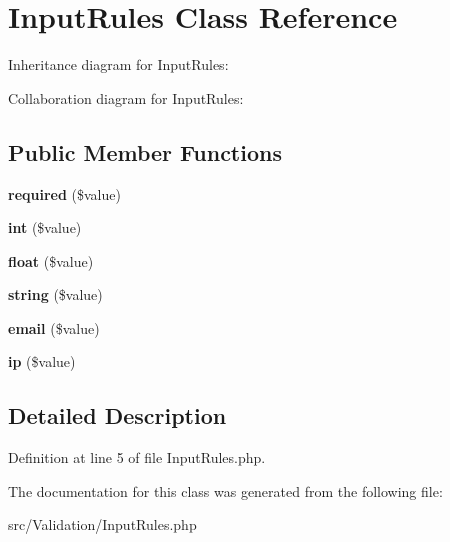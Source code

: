 \hypertarget{class_zest_1_1_validation_1_1_input_rules}{}\section{Input\+Rules Class Reference}
\label{class_zest_1_1_validation_1_1_input_rules}


Inheritance diagram for Input\+Rules\+:


Collaboration diagram for Input\+Rules\+:
\subsection*{Public Member Functions}
\begin{DoxyCompactItemize}
\item 
\mbox{\label{class_zest_1_1_validation_1_1_input_rules_a0797c5d18eb9296abe724f5f5e929fb3}} 
{\bfseries required} (\$value)
\item 
\mbox{\label{class_zest_1_1_validation_1_1_input_rules_a07c68caa9720fa053aadfce0b35f7662}} 
{\bfseries int} (\$value)
\item 
\mbox{\label{class_zest_1_1_validation_1_1_input_rules_af350d4d62f8936e67b40948842213bf5}} 
{\bfseries float} (\$value)
\item 
\mbox{\label{class_zest_1_1_validation_1_1_input_rules_af168408db12bfe7bb7e326a765fa085d}} 
{\bfseries string} (\$value)
\item 
\mbox{\label{class_zest_1_1_validation_1_1_input_rules_abf2481accb6bdc43b2940e1bcb8e095d}} 
{\bfseries email} (\$value)
\item 
\mbox{\label{class_zest_1_1_validation_1_1_input_rules_a3d0749836b630324b0b0d2e6ea0ba480}} 
{\bfseries ip} (\$value)
\end{DoxyCompactItemize}


\subsection{Detailed Description}


Definition at line 5 of file Input\+Rules.\+php.



The documentation for this class was generated from the following file\+:\begin{DoxyCompactItemize}
\item 
src/\+Validation/Input\+Rules.\+php\end{DoxyCompactItemize}
